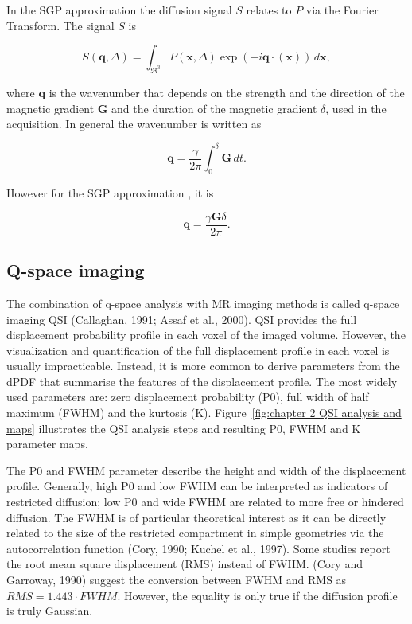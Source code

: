 In the SGP approximation the diffusion signal $S$ relates to $P$ via the Fourier Transform. The signal $S$ is

\begin{equation}
S(\textbf{q},\Delta)=\int_{\Re^3}P(\textbf{x},\Delta)\exp(-i\textbf{q}\cdot(\textbf{x}))\,d\textbf{x},
\label{fourier}
\end{equation}

where $\textbf{q}$ is the wavenumber that depends on the strength and the direction of the magnetic gradient $\textbf{G}$ and the duration of the magnetic gradient $\delta$, used in the acquisition. In general the wavenumber is written as

\begin{equation}
\textbf{q}=\frac{\gamma}{2\pi}\int^\delta_0 \textbf{G}\,dt.
\label{q}
\end{equation}

However for the SGP approximation  \cite{Price1}, it is

 \begin{equation}
\textbf{q}=\frac{\gamma \textbf{G}\delta}{2\pi}.
\label{qsgp}
\end{equation}

\subsection{Q-space imaging}
\label{sec:qspace}
The combination of q-space analysis with MR imaging methods is called q-space imaging \gls{QSI} (Callaghan, 1991; Assaf et al., 2000). \gls{QSI} provides the full displacement probability profile in each voxel of the imaged volume. However, the visualization and quantification of the full displacement profile in each voxel is usually impracticable. Instead, it is more common to derive parameters from the dPDF that summarise the features of the displacement profile. The most widely used parameters are: zero displacement probability (P0), full width of half maximum (FWHM) and the kurtosis (K). Figure~\ref{fig:chapter 2 QSI analysis and maps} illustrates the QSI analysis steps and resulting P0, FWHM and K parameter maps.

The P0 and FWHM parameter describe the height and width of the displacement profile. Generally, high P0 and low FWHM can be interpreted as indicators of restricted diffusion; low P0 and wide FWHM are related to more free or hindered diffusion. The FWHM is of particular theoretical interest as it can be directly related to the size of the restricted compartment in simple geometries via the autocorrelation function (Cory, 1990; Kuchel et al., 1997). Some studies report the root mean square displacement (RMS) instead of FWHM. (Cory and Garroway, 1990) suggest the conversion between FWHM and RMS as $RMS = 1.443 \cdot FWHM$. However, the equality is only true if the diffusion profile is truly Gaussian.


